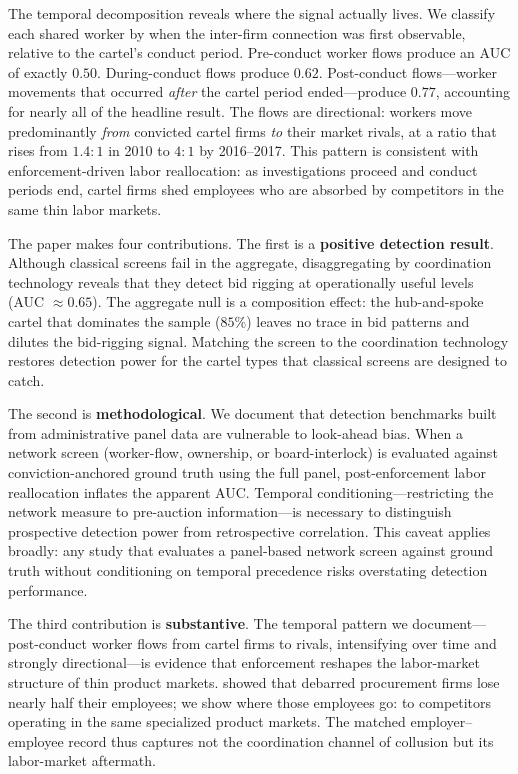 The temporal decomposition reveals where the signal actually lives. We classify each shared worker by when the inter-firm connection was first observable, relative to the cartel's conduct period. Pre-conduct worker flows produce an AUC of exactly $0.50$. During-conduct flows produce $0.62$. Post-conduct flows---worker movements that occurred \emph{after} the cartel period ended---produce $0.77$, accounting for nearly all of the headline result. The flows are directional: workers move predominantly \emph{from} convicted cartel firms \emph{to} their market rivals, at a ratio that rises from $1.4{:}1$ in 2010 to $4{:}1$ by 2016--2017. This pattern is consistent with enforcement-driven labor reallocation: as investigations proceed and conduct periods end, cartel firms shed employees who are absorbed by competitors in the same thin labor markets.

The paper makes four contributions. The first is a \textbf{positive detection result}. Although classical screens fail in the aggregate, disaggregating by coordination technology reveals that they detect bid rigging at operationally useful levels (AUC $\approx 0.65$). The aggregate null is a composition effect: the hub-and-spoke cartel that dominates the sample ($85\%$) leaves no trace in bid patterns and dilutes the bid-rigging signal. Matching the screen to the coordination technology restores detection power for the cartel types that classical screens are designed to catch.

The second is \textbf{methodological}. We document that detection benchmarks built from administrative panel data are vulnerable to look-ahead bias. When a network screen (worker-flow, ownership, or board-interlock) is evaluated against conviction-anchored ground truth using the full panel, post-enforcement labor reallocation inflates the apparent AUC. Temporal conditioning---restricting the network measure to pre-auction information---is necessary to distinguish prospective detection power from retrospective correlation. This caveat applies broadly: any study that evaluates a panel-based network screen against ground truth without conditioning on temporal precedence risks overstating detection performance.

The third contribution is \textbf{substantive}. The temporal pattern we document---post-conduct worker flows from cartel firms to rivals, intensifying over time and strongly directional---is evidence that enforcement reshapes the labor-market structure of thin product markets. \citet{szerman2023employee} showed that debarred procurement firms lose nearly half their employees; we show where those employees go: to competitors operating in the same specialized product markets. The matched employer--employee record thus captures not the coordination channel of collusion but its labor-market aftermath.

